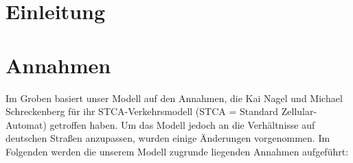\documentclass[11pt, a4paper]{article}
\begin{document}
\tableofcontents

\newpage


\section{Einleitung}
\label{sec:einleitung}

\newpage
\section{Annahmen}
\label{sec:ansatz}

Im Groben basiert unser Modell auf den Annahmen, die Kai Nagel und Michael Schreckenberg \cite{nagel-schreckenberg} für ihr STCA-Verkehrsmodell (STCA = Standard Zellular-Automat) getroffen haben. Um das Modell jedoch an die Verhältnisse auf deutschen Straßen anzupassen, wurden einige Änderungen vorgenommen.
Im Folgenden werden die unserem Modell zugrunde liegenden Annahmen aufgeführt:\\
\end{document}
